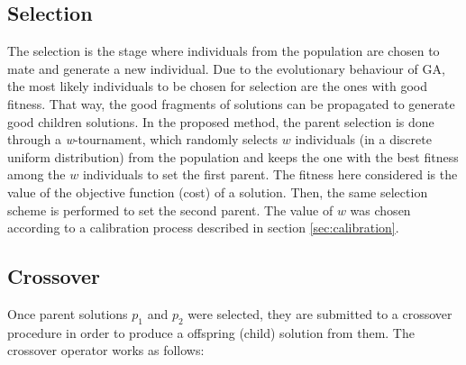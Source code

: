 \subsection{Selection}
\label{subsec:selection}
The selection is the stage where individuals from the population are chosen to mate and generate a new individual. Due to the evolutionary behaviour of GA, the most likely individuals to be chosen for selection are the ones with good fitness. That way, the good fragments of solutions can be propagated to generate good children solutions. In the proposed method, the parent selection is done through a \textit{w}-tournament, which randomly selects $w$ individuals (in a discrete uniform distribution) from the population and keeps the one with the best fitness among the $w$ individuals to set the first parent. The fitness here considered is the value of the objective function (cost) of a solution. Then, the same selection scheme is performed to set the second parent. The value of $w$ was chosen according to a calibration process described in section \ref{sec:calibration}.

\subsection{Crossover}
\label{subsec:crossover}
Once parent solutions $p_1$ and $p_2$ were selected, they are submitted to a crossover procedure in order to produce a offspring (child) solution from them. The crossover operator works as follows:

